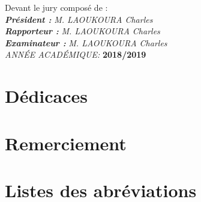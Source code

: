 \documentclass[12pt,a4paper]{report}
\newlength{\drop}
\begin{document}
	
\textheight%
\vspace{0.1\drop}%
\begin{center}
	
	
	Devant le jury composé de :\\
	\vspace{0.2cm}
	\emph{\textbf{Président : }}  \textit{M. LAOUKOURA Charles}\\
	\emph{\textbf{Rapporteur : }}  \textit{M. LAOUKOURA Charles}\\
	\emph{\textbf{Examinateur : }}  \textit{M. LAOUKOURA Charles}\\
	
	\textheight%
	\vspace{0.5\drop}
	\textit{ANNÉE ACADÉMIQUE:} \textbf{2018/2019}
\end{center}



\onehalfspacing
\newpage

\setcounter{page}{1}

\newpage

\section*{Dédicaces}

\pagebreak

\section*{Remerciement}

\pagebreak

\tableofcontents   %



\pagebreak
\section*{Listes des abréviations}
\end{document}
